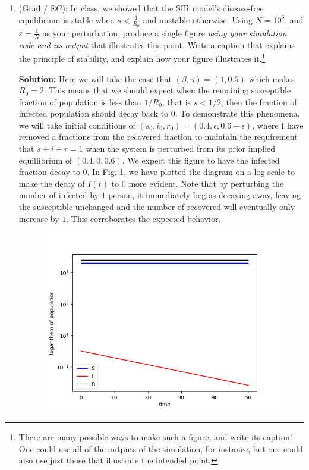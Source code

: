 \documentclass[11pt]{article}
\begin{document}
\begin{enumerate}
\clearpage
\item (Grad / EC): In class, we showed that the SIR model's disease-free equilibrium is stable when $s<\tfrac{1}{R_0}$ and unstable otherwise. Using $N=10^6$, and $\varepsilon = \frac{1}{N}$ as your perturbation, produce a single figure {\it using your simulation code and its output} that illustrates this point. Write a caption that explains the principle of stability, and explain how your figure illustrates it.\footnote{There are many possible ways to make such a figure, and write its caption! One could use all of the outputs of the simulation, for instance, but one could also use just those that illustrate the intended point.}
\begin{tcolorbox}[breakable]
	\textbf{Solution:}
	Here we will take the case that $(\beta, \gamma)=(1, 0.5)$ which makes $R_0=2$. This means that we should expect when the remaining susceptible fraction of population is less than $1/R_0$, that is $s<1/2$, then the fraction of infected population should decay back to $0$. To demonstrate this phenomena, we will take initial conditions of $(s_0, i_0, r_0)=(0.4, \epsilon, 0.6-\epsilon)$, where I have removed a fraction$\epsilon$ from the recovered fraction to maintain the requirement that $s+i+r=1$ when the system is perturbed from its prior implied equillibrium of $(0.4, 0, 0.6)$. We expect this figure to have the infected fraction decay to $0$. In Fig. \ref{im:log}, we have plotted the diagram on a log-scale to make the decay of $I(t)$ to 0 more evident. Note that by perturbing the number of infected by $1$ person, it immediately begins decaying away, leaving the susceptible unchanged and the number of recovered will eventually only increase by $1$. This corroborates the expected behavior.
\end{tcolorbox}

\begin{figure}[H]
	\centering
	\includegraphics[scale=0.7]{p4.png}
	\label{im:log}
\end{figure}

\end{enumerate}
\end{document}
